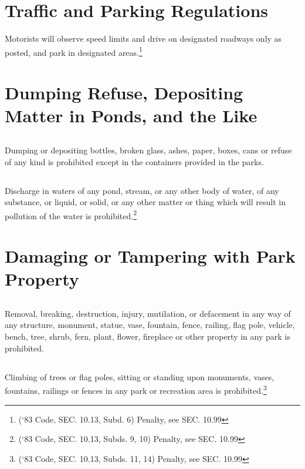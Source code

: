 \section{Traffic and Parking Regulations}
Motorists will observe speed limits and drive on designated roadways only as posted, and park in designated areas.\footnote{(‘83 Code, SEC. 10.13, Subd. 6)  Penalty, see SEC. 10.99}

\section{Dumping Refuse, Depositing Matter in Ponds, and the Like}
\subsection{}
Dumping or depositing bottles, broken glass, ashes, paper, boxes, cans or refuse of any kind is prohibited except in the containers provided in the parks.
\subsection{}
Discharge in waters of any pond, stream, or any other body of water, of any substance, or liquid, or solid, or any other matter or thing which will result in pollution of the water is prohibited.\footnote{(‘83 Code, SEC. 10.13, Subds. 9, 10)  Penalty, see SEC. 10.99}

\section{Damaging or Tampering with Park Property}
\subsection{}
Removal, breaking, destruction, injury, mutilation, or defacement in any way of any structure, monument, statue, vase, fountain, fence, railing, flag pole, vehicle, bench, tree, shrub, fern, plant, flower, fireplace or other property in any park is prohibited.
\subsection{}
Climbing of trees or flag poles, sitting or standing upon monuments, vases, fountains, railings or fences in any park or recreation area is prohibited.\footnote{(‘83 Code, SEC. 10.13, Subds. 11, 14)  Penalty, see SEC. 10.99}

